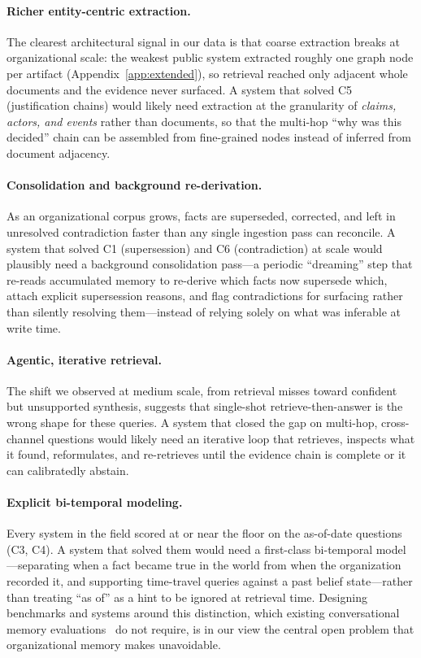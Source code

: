 \paragraph{Richer entity-centric extraction.}
\label{para:future-entity-extraction}
The clearest architectural signal in our data is that coarse extraction breaks
at organizational scale: the weakest public system extracted roughly one graph
node per artifact (Appendix~\ref{app:extended}), so retrieval reached only
adjacent whole documents and the evidence never surfaced. A system that solved
C5 (justification chains) would likely need extraction at the granularity of
\emph{claims, actors, and events} rather than documents, so that the multi-hop
``why was this decided'' chain can be assembled from fine-grained nodes instead
of inferred from document adjacency.

\paragraph{Consolidation and background re-derivation.}
\label{para:future-consolidation}
As an organizational corpus grows, facts are superseded, corrected, and left in
unresolved contradiction faster than any single ingestion pass can reconcile. A
system that solved C1 (supersession) and C6 (contradiction) at scale would
plausibly need a background consolidation pass---a periodic ``dreaming'' step
that re-reads accumulated memory to re-derive which facts now supersede which,
attach explicit supersession reasons, and flag contradictions for surfacing
rather than silently resolving them---instead of relying solely on what was
inferable at write time.

\paragraph{Agentic, iterative retrieval.}
\label{para:future-agentic-retrieval}
The shift we observed at medium scale, from retrieval misses toward confident but
unsupported synthesis, suggests that single-shot retrieve-then-answer is the
wrong shape for these queries. A system that closed the gap on multi-hop,
cross-channel questions would likely need an iterative loop that retrieves,
inspects what it found, reformulates, and re-retrieves until the evidence chain
is complete or it can calibratedly abstain.

\paragraph{Explicit bi-temporal modeling.}
\label{para:future-bitemporal-modeling}
Every system in the field scored at or near the floor on the as-of-date
questions (C3, C4). A system that solved them would need a first-class
bi-temporal model---separating when a fact became true in the world from when
the organization recorded it, and supporting time-travel queries against a past
belief state---rather than treating ``as of'' as a hint to be ignored at
retrieval time. Designing benchmarks and systems around this distinction, which
existing conversational memory evaluations~\citep{maharana2024locomo,
wu2024longmemeval,beam2025} do not require, is in our view the central open
problem that organizational memory makes unavoidable.
